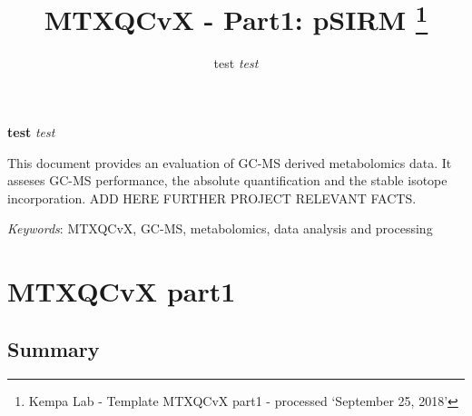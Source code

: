 \documentclass[9pt,]{article}
\title{MTXQCvX - Part1: pSIRM \thanks{Kempa Lab - Template MTXQCvX part1 - processed `September 25, 2018'}  }
\author{\Large test\vspace{0.05in} \newline\normalsize\emph{test}  }
\date{}
\newcommand*{\authorfont}{\fontfamily{phv}\selectfont}
\renewenvironment{abstract}
 {{%
    \setlength{\leftmargin}{0mm}
    \setlength{\rightmargin}{\leftmargin}%
  }%
  \relax}
 {\endlist}
\begin{document}
	
%

{%
\setlength{\parindent}{0pt}
\thispagestyle{plain}
{\fontsize{18}{20}\selectfont\raggedright 
\maketitle  %

}

{
   \vskip 13.5pt\relax \normalsize\fontsize{11}{12} 
\textbf{\authorfont test} \hskip 15pt \emph{\small test}   

}

}



{
\hypersetup{linkcolor=black}
\setcounter{tocdepth}{2}
\tableofcontents
}




\begin{abstract}

    \hbox{\vrule height .2pt width 39.14pc}

    \vskip 8.5pt %

\noindent This document provides an evaluation of GC-MS derived metabolomics data.
It asseses GC-MS performance, the absolute quantification and the stable
isotope incorporation. ADD HERE FURTHER PROJECT RELEVANT FACTS.


\vskip 8.5pt \noindent \emph{Keywords}: MTXQCvX, GC-MS, metabolomics, data analysis and processing \par

    \hbox{\vrule height .2pt width 39.14pc}



\end{abstract}


\vskip 6.5pt

\noindent  \section{MTXQCvX part1}\label{mtxqcvx-part1}

\subsection{Summary}\label{summary}
\end{document}
